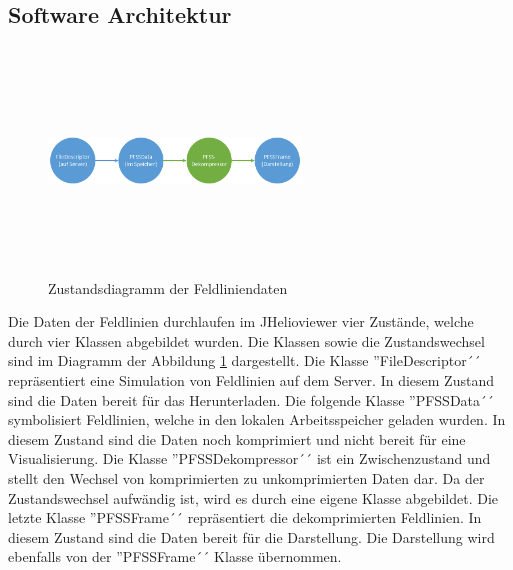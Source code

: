 \subsection{Software Architektur}
\begin{figure}[!htbp]
	\center
	\includegraphics[width=0.6\textwidth,height=6cm,keepaspectratio]{./pictures/implementation/dataflow.png}
	\caption{Zustandsdiagramm der Feldliniendaten}
	\label{implementation:architektur:datenfluss}
\end{figure}
Die Daten der Feldlinien durchlaufen im JHelioviewer vier Zustände, welche durch vier Klassen abgebildet wurden. Die Klassen sowie die Zustandswechsel sind im Diagramm der Abbildung \ref{implementation:architektur:datenfluss} dargestellt. Die Klasse ''FileDescriptor´´ repräsentiert eine Simulation von Feldlinien auf dem Server. In diesem Zustand sind die Daten bereit für das Herunterladen. Die folgende Klasse ''PFSSData´´ symbolisiert Feldlinien, welche in den lokalen Arbeitsspeicher geladen wurden. In diesem Zustand sind die Daten noch komprimiert und nicht bereit für eine Visualisierung. Die Klasse ''PFSSDekompressor´´ ist ein Zwischenzustand und stellt den Wechsel von komprimierten zu unkomprimierten Daten dar. Da der Zustandswechsel aufwändig ist, wird es durch eine eigene Klasse abgebildet. Die letzte Klasse ''PFSSFrame´´ repräsentiert die dekomprimierten Feldlinien. In diesem Zustand sind die Daten bereit für die Darstellung. Die Darstellung wird ebenfalls von der ''PFSSFrame´´ Klasse übernommen.

